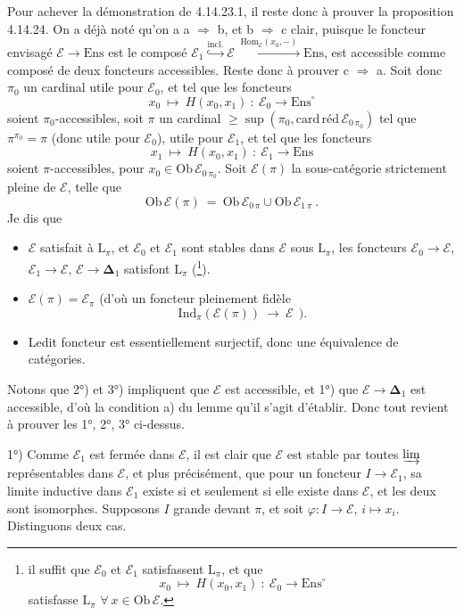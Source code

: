 \documentclass[11pt]{article}
\newcommand{\printedpage}[1]{\marginpar{\footnotesize p.~#1}}
\newcommand{\msp}[1]{\marginpar{\footnotesize [#1]}}
\newcommand{\bDelta}{\boldsymbol{\Delta}}
\newcommand{\Ens}{\mathrm{Ens}}
\newcommand{\Ob}{\mathrm{Ob}\,}
\newcommand{\Hom}{\mathrm{Hom}}
\begin{document}
Pour achever la démonstration de 4.14.23.1, il reste donc à prouver la proposition 4.14.24. On a déjà noté qu'on a a $\Longrightarrow$ b, et b $\Longrightarrow$ c clair, puisque le foncteur envisagé $\mathcal{E}\longrightarrow\Ens$ est le composé $\mathcal{E}_1\overset{\text{incl.}}{\hookrightarrow}\mathcal{E}\xrightarrow{\;\Hom_{\mathcal{E}}(x_0,-)\;}\Ens$, est accessible comme composé de deux
\msp{page 415}
foncteurs accessibles. Reste donc à prouver c $\Longrightarrow$ a. Soit donc $\pi_0$ un cardinal utile pour $\mathcal{E}_0$, et tel que les foncteurs
\[
x_0\ \longmapsto\ H(x_0,x_1)\ :\ \mathcal{E}_0\longrightarrow\Ens^{\circ}
\]
soient $\pi_0$-accessibles, soit $\pi$ un cardinal $\geqslant\sup(\pi_0,\mathrm{card}\,\text{réd}\,\mathcal{E}_{0\,\pi_0})$ tel que $\pi^{\pi_0}=\pi$ (donc utile pour $\mathcal{E}_0$), utile pour $\mathcal{E}_1$, et tel que les foncteurs
\[
x_1\ \longmapsto\ H(x_0,x_1)\ :\ \mathcal{E}_1\longrightarrow\Ens
\]
soient $\pi$-accessibles, pour $x_0\in\Ob\mathcal{E}_{0\,\pi_0}$. Soit $\mathcal{E}(\pi)$ la sous-catégorie strictement pleine de $\mathcal{E}$, telle que
\[
\Ob\mathcal{E}(\pi)\ =\ \Ob\mathcal{E}_{0\,\pi}\cup\Ob\mathcal{E}_{1\,\pi}\ .
\]
Je dis que
\begin{itemize}[leftmargin=*]
\item[1°)] $\mathcal{E}$ satisfait à $\mathrm{L}_\pi$, et $\mathcal{E}_0$ et $\mathcal{E}_1$ sont stables dans $\mathcal{E}$ sous $\mathrm{L}_\pi$, les foncteurs $\mathcal{E}_0\longrightarrow\mathcal{E}$, $\mathcal{E}_1\longrightarrow\mathcal{E}$, $\mathcal{E}\longrightarrow\bDelta_1$ satisfont $\mathrm{L}_\pi$ (\footnote[174]{il suffit que $\mathcal{E}_0$ et $\mathcal{E}_1$ satisfassent $\mathrm{L}_\pi$, et que
\[
x_0\ \longmapsto\ H(x_0,x_1)\ :\ \mathcal{E}_0\longrightarrow\Ens^{\circ}
\]
satisfasse $\mathrm{L}_\pi$ $\forall\ x\in\Ob\mathcal{E}$.}).
\item[2°)] $\mathcal{E}(\pi)=\mathcal{E}_\pi$ (d'où un foncteur pleinement fidèle
\[
\mathrm{Ind}_\pi(\mathcal{E}(\pi))\ \longrightarrow\ \mathcal{E}\ \ ).
\]
\item[3°)] Ledit foncteur est essentiellement surjectif,
\msp{page 416}
donc une équivalence de catégories.
\end{itemize}
Notons que 2°) et 3°) impliquent que $\mathcal{E}$ est accessible, et 1°) que $\mathcal{E}\longrightarrow\bDelta_1$ est accessible, d'où la condition a) du lemme qu'il s'agit d'établir. Donc tout revient à prouver les 1°, 2°, 3° ci-dessus.

\printedpage{158}
1°) Comme $\mathcal{E}_1$ est fermée dans $\mathcal{E}$, il est clair que $\mathcal{E}$ est stable par toutes $\varinjlim$ représentables dans $\mathcal{E}$, et plus précisément, que pour un foncteur $I\longrightarrow\mathcal{E}_1$, sa limite inductive dans $\mathcal{E}_1$ existe si et seulement si elle existe dans $\mathcal{E}$, et les deux sont isomorphes. Supposons $I$ grande devant $\pi$, et soit $\varphi:I\longrightarrow\mathcal{E}$, $i\longmapsto x_i$. Distinguons deux cas.
\end{document}
